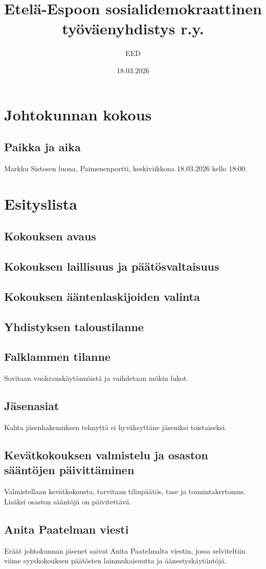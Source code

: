 \documentclass[a4paper,12pt]{article}
\title{Etelä-Espoon sosialidemokraattinen työväenyhdistys r.y.}
\author{EED}
\date{18.03.2026}
\begin{document}
\maketitle
\tableofcontents
\section*{Johtokunnan kokous}
\subsection*{Paikka ja aika}
Markku Sistosen luona, Paimenenportti, keskiviikkona 18.03.2026 kello 18:00.
\section*{Esityslista}
\subsection{Kokouksen avaus}
\subsection{Kokouksen laillisuus ja päätösvaltaisuus}
\subsection{Kokouksen ääntenlaskijoiden valinta}
\subsection{Yhdistyksen taloustilanne}
\subsection{Falklammen tilanne}
Sovitaan vuokrauskäytännöistä ja vaihdetaan mökin lukot.
\subsection{Jäsenasiat}
Kahta jäsenhakemuksen tehnyttä ei hyväksyttäne jäseniksi toistaiseksi.
\subsection{Kevätkokouksen valmistelu ja osaston sääntöjen päivittäminen}
Valmistellaan kevätkokousta, tarvitaan tilinpäätös, tase ja toimintakertomus. Lisäksi osaston sääntöjä on päivitettävä.
\subsection{Anita Paatelman viesti}
Eräät johtokunnan jäsenet saivat Anita Paatelmalta viestin, jossa selviteltiin viime syyskokouksen päätösten lainmukaisuutta ja äänestyskäytäntöjä.
\end{document}
